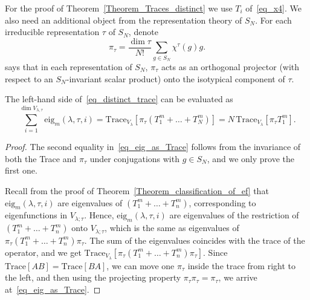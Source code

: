 For the proof of Theorem~\ref{Theorem_Traces_distinct} we use $T_i$ of~\eqref{eq_x4}. We also need an additional object from the representation theory of $S_N$. For each irreducible representation $\tau$ of $S_N$, denote
\begin{equation}
\label{eq_projector}
 \pi_\tau= \frac{\dim \tau}{N!} \sum_{g\in S_N} \chi^\tau(g) g.
\end{equation}
\cite[Theorem 8]{serre1977linear} says that in each representation of $S_N$, $\pi_\tau$ acts as an orthogonal projector (with respect to an $S_N$-invariant scalar product) onto the isotypical component of $\tau$.


\begin{lemma} \label{Lemma_projector}
 The left-hand side of~\eqref{eq_distinct_trace} can be evaluated as
 \begin{equation}
 \label{eq_eig_as_Trace}
   \sum_{i=1}^{\dim V_{\lambda,\tau}} \mathrm{eig}_m(\lambda,\tau,i) =\mathrm{Trace}_{V_\lambda} \left[\pi_\tau (T_1^m+\dots+T_N^m)\right]= N\,  \mathrm{Trace}_{V_\lambda} \left[\pi_\tau T_1^m\right].
 \end{equation}
\end{lemma}
\begin{proof}
 The second equality in~\eqref{eq_eig_as_Trace} follows from the invariance of both the Trace and $\pi_\tau$ under conjugations with $g\in S_N$, and we only prove the first one.

 Recall from the proof of Theorem~\ref{Theorem_classification_of_ef} that $\mathrm{eig}_m(\lambda,\tau,i)$ are eigenvalues of $(T_1^m+\dots+T_n^m)$, corresponding to eigenfunctions in $V_{\lambda;\tau}$. Hence, $\mathrm{eig}_m(\lambda,\tau,i)$ are eigenvalues of the restriction of $(T_1^m+\dots+T_n^m)$ onto $V_{\lambda;\tau}$, which is the same as eigenvalues of $\pi_\tau (T_1^m+\dots+T_n^m) \pi_\tau$. The sum of the eigenvalues coincides with the trace of the operator, and we get $\mathrm{Trace}_{V_\lambda} \left[\pi_\tau (T_1^m+\dots+T_n^m)\pi_\tau\right]$. Since $\mathrm{Trace}[AB]=\mathrm{Trace}[BA]$, we can move one $\pi_\tau$ inside the trace from right to the left, and then using the projecting property $\pi_\tau \pi_\tau=\pi_\tau$, we arrive at~\eqref{eq_eig_as_Trace}.
\end{proof}

